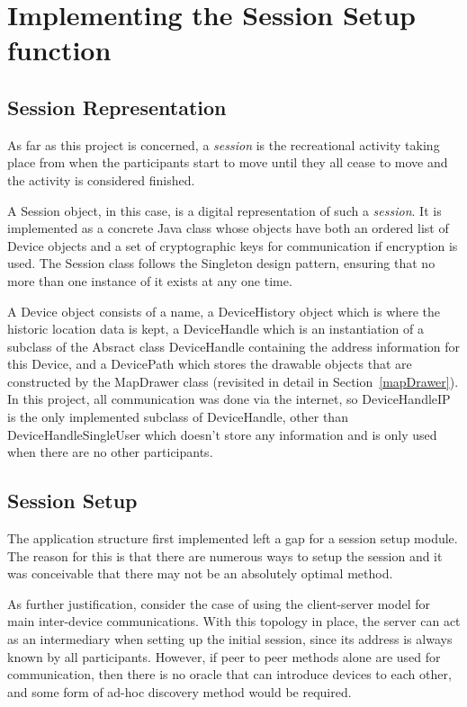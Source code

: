\section{Implementing the Session Setup function}

\subsection{Session Representation}

As far as this project is concerned, a \emph{session} is the recreational activity taking place from when the participants start to move until they all cease to move and the activity is considered finished.

A Session object, in this case, is a digital representation of such a \emph{session}. It is implemented as a concrete Java class whose objects have both an ordered list of Device objects and a set of cryptographic keys for communication if encryption is used. The Session class follows the Singleton design pattern, ensuring that no more than one instance of it exists at any one time.

A Device object consists of a name, a DeviceHistory object which is where the historic location data is kept, a DeviceHandle which is an instantiation of a subclass of the Absract class DeviceHandle containing the address information for this Device, and a DevicePath which stores the drawable objects that are constructed by the MapDrawer class (revisited in detail in Section~\ref{mapDrawer}).
In this project, all communication was done via the internet, so DeviceHandleIP is the only implemented subclass of DeviceHandle, other than DeviceHandleSingleUser which doesn't store any information and is only used when there are no other participants.

\subsection{Session Setup}

The application structure first implemented left a gap for a session setup module. The reason for this is that there are numerous ways to setup the session and it was conceivable that there may not be an absolutely optimal method.

As further justification, consider the case of using the client-server model for main inter-device communications. With this topology in place, the server can act as an intermediary when setting up the initial session, since its address is always known by all participants. However, if peer to peer methods alone are used for communication, then there is no oracle that can introduce devices to each other, and some form of ad-hoc discovery method would be required.

